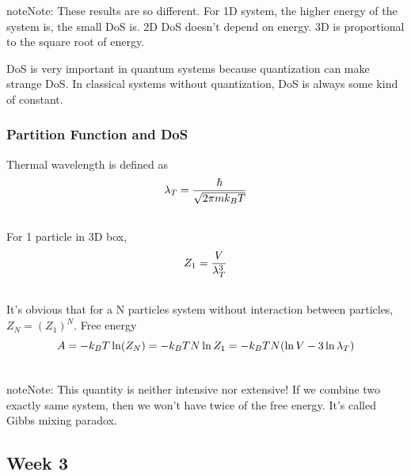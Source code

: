 \documentclass[letterpaper,10pt,english]{sphinxmanual}
\begin{document}
\begin{notice}{note}{Note:}
These results are so different. For 1D system, the higher energy of the system is, the small DoS is. 2D DoS doesn't depend on energy. 3D is proportional to the square root of energy.

DoS is very important in quantum systems because quantization can make strange DoS. In classical systems without quantization, DoS is always some kind of constant.
\end{notice}


\subsubsection{Partition Function and DoS}
\label{equilibrium/week2:partition-function-and-dos}
Thermal wavelength is defined as
\begin{gather}
\begin{split}\lambda_T = \frac{\hbar}{ \sqrt{ 2\pi m k_B T } }\end{split}\notag\\\begin{split}\end{split}\notag
\end{gather}
For 1 particle in 3D box,
\begin{gather}
\begin{split}Z_1 = \frac{V}{\lambda_T^3}\end{split}\notag\\\begin{split}\end{split}\notag
\end{gather}
It's obvious that for a N particles system without interaction between particles, $Z_N  = (Z_1)^N$. Free energy
\begin{gather}
\begin{split}A = -k_B T \ln (Z_N) = -k_B T N \ln Z_1 = -k_B T N (\ln V - 3\ln \lambda_T)\end{split}\notag\\\begin{split}\end{split}\notag
\end{gather}
\begin{notice}{note}{Note:}
This quantity is neither intensive nor extensive! If we combine two exactly same system, then we won't have twice of the free energy. It's called Gibbs mixing paradox.
\end{notice}


\subsection{Week 3}
\label{equilibrium/week3::doc}\label{equilibrium/week3:week-3}
\end{document}

